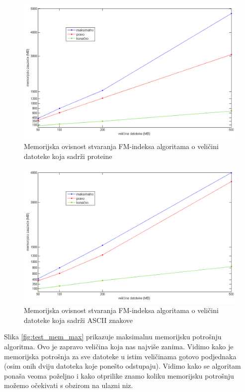 \begin{figure}[H]
   \centering
       \includegraphics[width=\textwidth]{./pictures/test_mem_proteini.png}
 \caption{Memorijska ovisnost stvaranja FM-indeksa algoritama o veličini datoteke koja sadrži proteine}
 \label{fig:test_mem_proteini}
\end{figure}

\begin{figure}[H]
   \centering
       \includegraphics[width=\textwidth]{./pictures/test_mem_ascii.png}
 \caption{Memorijska ovisnost stvaranja FM-indeksa algoritama o veličini datoteke koja sadrži ASCII znakove}
 \label{fig:test_mem_ascii}
\end{figure}

Slika  \ref{fig:test_mem_max} prikazuje maksimalnu memorijsku potrošnju algoritma. Ovo je zapravo veličina koja nas najviše zanima. Vidimo kako je memorijska potrošnja za sve datoteke u istim veličinama gotovo podjednaka (osim onih dviju datoteka koje ponešto odstupaju). Vidimo kako se algoritam ponaša veoma poželjno i kako otprilike znamo koliku memorijsku potrošnju možemo očekivati s obzirom na ulazni niz.

